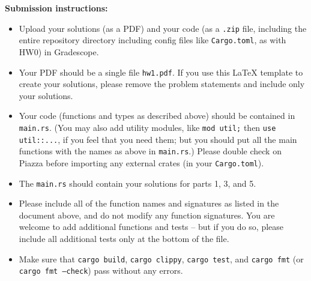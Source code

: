 \documentclass{article}
\begin{document}
\newpage

\noindent
\textbf{Submission instructions:}
\begin{itemize}
\item Upload your solutions (as a PDF) and your code (as a \texttt{.zip} file, including the entire repository directory including config files like \texttt{Cargo.toml}, as with HW0) in Gradescope.
\item Your PDF should be a single file \texttt{hw1.pdf}. If you use this LaTeX template to create your solutions, please remove the problem statements and include only your solutions.
\item Your code (functions and types as described above) should be contained in \texttt{main.rs}.
(You may also add utility modules, like \texttt{mod util;} then \texttt{use util::...}, if you feel that you need them; but you should put all the main functions with the names as above in \texttt{main.rs}.) Please double check on Piazza before importing any external crates (in your \texttt{Cargo.toml}).

\item The \texttt{main.rs} should contain your solutions for parts 1, 3, and 5.

\item Please include all of the function names and signatures as listed in the document above, and do not modify any function signatures. You are welcome to add additional functions and tests -- but if you do so, please include all additional tests only at the bottom of the file.

\item Make sure that \texttt{cargo build}, \texttt{cargo clippy}, \texttt{cargo test}, and \texttt{cargo fmt} (or \texttt{cargo fmt --check}) pass without any errors.
\end{itemize}
\end{document}
